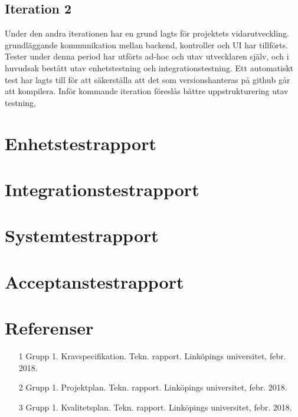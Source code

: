 \documentclass[10pt]{article}
\begin{document}
\subsection{Iteration 2}
Under den andra iterationen har en grund lagts för projektets vidarutveckling. grundläggande kommunikation mellan backend, kontroller och UI har tillförts. Tester under denna period har utförts ad-hoc och utav utvecklaren själv, och i huvudsak bestått utav enhetstestning och integrationstestning. Ett automatiskt test har lagts till för att säkerställa att det som versionshanteras på github går att kompilera. Inför kommande iteration föreslås bättre uppstrukturering utav testning,

\section{Enhetstestrapport}
\section{Integrationstestrapport}
\section{Systemtestrapport}
\section{Acceptanstestrapport}
	

\section{Referenser}
	\begin{itemize}
	\item [1] Grupp 1. Kravspecifikation. Tekn. rapport. Linköpings universitet, febr. 2018.
	\item [2] Grupp 1. Projektplan. Tekn. rapport. Linköpings universitet, febr. 2018.
	\item [3] Grupp 1. Kvalitetsplan. Tekn. rapport. Linköpings universitet, febr. 2018.
	\end{itemize}
	
\end{document}
